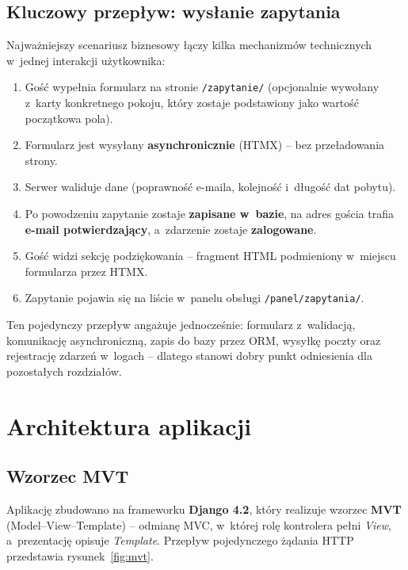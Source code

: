 \documentclass[12pt,a4paper]{article}
\begin{document}
\subsection{Kluczowy przepływ: wysłanie zapytania}
\label{sec:przeplyw}

Najważniejszy scenariusz biznesowy łączy kilka mechanizmów technicznych w~jednej
interakcji użytkownika:

\begin{enumerate}[nosep]
  \item Gość wypełnia formularz na stronie \texttt{/zapytanie/} (opcjonalnie
    wywołany z~karty konkretnego pokoju, który zostaje podstawiony jako wartość
    początkowa pola).
  \item Formularz jest wysyłany \textbf{asynchronicznie} (HTMX) -- bez przeładowania
    strony.
  \item Serwer waliduje dane (poprawność e-maila, kolejność i~długość dat pobytu).
  \item Po powodzeniu zapytanie zostaje \textbf{zapisane w~bazie}, na adres gościa
    trafia \textbf{e-mail potwierdzający}, a~zdarzenie zostaje \textbf{zalogowane}.
  \item Gość widzi sekcję podziękowania -- fragment HTML podmieniony w~miejscu
    formularza przez HTMX.
  \item Zapytanie pojawia się na liście w~panelu obsługi \texttt{/panel/zapytania/}.
\end{enumerate}

Ten pojedynczy przepływ angażuje jednocześnie: formularz z~walidacją, komunikację
asynchroniczną, zapis do bazy przez ORM, wysyłkę poczty oraz rejestrację zdarzeń
w~logach -- dlatego stanowi dobry punkt odniesienia dla pozostałych rozdziałów.

\section{Architektura aplikacji}
\label{sec:architektura}

\subsection{Wzorzec MVT}

Aplikację zbudowano na frameworku \textbf{Django 4.2}, który realizuje wzorzec
\textbf{MVT} (Model--View--Template) -- odmianę MVC, w~której rolę kontrolera pełni
\emph{View}, a~prezentację opisuje \emph{Template}. Przepływ pojedynczego żądania
HTTP przedstawia rysunek~\ref{fig:mvt}.
\end{document}
